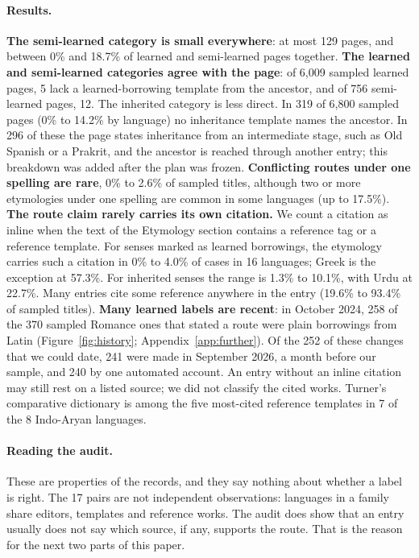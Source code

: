 \documentclass[11pt]{article}
\begin{document}
\paragraph{Results.} \textbf{The semi-learned category is small everywhere}: at most 129 pages, and between 0\% and 18.7\% of learned and semi-learned pages together. \textbf{The learned and semi-learned categories agree with the page}: of 6,009 sampled learned pages, 5 lack a learned-borrowing template from the ancestor, and of 756 semi-learned pages, 12. The inherited category is less direct. In 319 of 6,800 sampled pages (0\% to 14.2\% by language) no inheritance template names the ancestor. In 296 of these the page states inheritance from an intermediate stage, such as Old Spanish or a Prakrit, and the ancestor is reached through another entry; this breakdown was added after the plan was frozen. \textbf{Conflicting routes under one spelling are rare}, 0\% to 2.6\% of sampled titles, although two or more etymologies under one spelling are common in some languages (up to 17.5\%). \textbf{The route claim rarely carries its own citation.} We count a citation as inline when the text of the Etymology section contains a reference tag or a reference template. For senses marked as learned borrowings, the etymology carries such a citation in 0\% to 4.0\% of cases in 16 languages; Greek is the exception at 57.3\%. For inherited senses the range is 1.3\% to 10.1\%, with Urdu at 22.7\%. Many entries cite some reference anywhere in the entry (19.6\% to 93.4\% of sampled titles). \textbf{Many learned labels are recent}: in October 2024, 258 of the 370 sampled Romance ones that stated a route were plain borrowings from Latin (Figure~\ref{fig:history}; Appendix~\ref{app:further}). Of the 252 of these changes that we could date, 241 were made in September 2026, a month before our sample, and 240 by one automated account. An entry without an inline citation may still rest on a listed source; we did not classify the cited works. Turner's comparative dictionary is among the five most-cited reference templates in 7 of the 8 Indo-Aryan languages.

\paragraph{Reading the audit.} These are properties of the records, and they say nothing about whether a label is right. The 17 pairs are not independent observations: languages in a family share editors, templates and reference works. The audit does show that an entry usually does not say which source, if any, supports the route. That is the reason for the next two parts of this paper.
\end{document}

